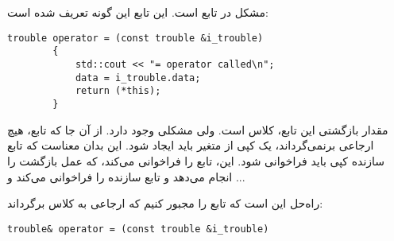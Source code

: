 \section{}
\paragraph{}\label{answer:109}
مشکل در تابع  است. این تابع این گونه تعریف شده است:
\begin{LTR}
    \begin{lstlisting}[style=C++Style]
        trouble operator = (const trouble &i_trouble)
        {
            std::cout << "= operator called\n";
            data = i_trouble.data;
            return (*this);
        }
    \end{lstlisting}
\end{LTR}

مقدار بازگشتی این تابع، کلاس  است. ولی مشکلی وجود دارد. از آن جا که تابع، هیچ ارجاعی برنمی‌گرداند، یک کپی از متغیر باید ایجاد شود. این بدان معناست که تابع سازنده کپی باید فراخوانی شود. این، تابع  را فراخوانی می‌کند، که عمل بازگشت را انجام می‌دهد و تابع سازنده را فراخوانی می‌کند و ...

راه‌حل این است که تابع  را مجبور کنیم که ارجاعی به کلاس برگرداند:
\begin{LTR}
    \begin{lstlisting}[style=C++Style]
        trouble& operator = (const trouble &i_trouble)
    \end{lstlisting}
\end{LTR}
